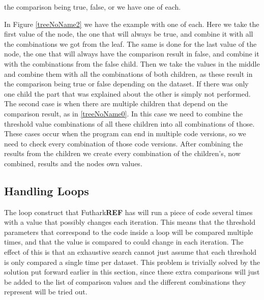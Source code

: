 the comparison being true, false, or we have one of each. 

In Figure \ref{treeNoName2} we have the example with one of each. Here we take the first
value of the node, the one that will always be true, and combine it with all
the combinations we got from the leaf. The same is done for the last value of
the node, the one that will always have the comparison result in false, and combine it with
the combinations from the false child. Then we take the values in the middle
and combine them with all the combinations of both children, as these result in
the comparison being true or false depending on the dataset. If there was only
one child the part that was explained about the other is simply not performed.\\
The second case is when 
there are multiple children that depend on the comparison result, as in \ref{treeNoName0}. In this case we need to combine the threshold value
combinations of all these children into all combinations of those. These cases
occur when the program can end in multiple code versions, so we need to check
every combination of those code versions. After combining the results from the
children we create every combination of the children's, now combined, results
and the nodes own values. 


\subsection{Handling Loops}
The loop construct that Futhark\textbf{REF} has will run a piece of code several times with
a value that possibly changes each iteration. This means that the threshold
parameters that correspond to the code inside a loop will be compared multiple
times, and that the value is compared to could change in each iteration. The
effect of this is that an exhaustive search cannot just assume that each
threshold is only compared a single time per dataset. This problem is
trivially solved by the solution put forward earlier in this section, since
these extra comparisons will just be added to the list of comparison values and
the different combinations they represent will be tried out.
